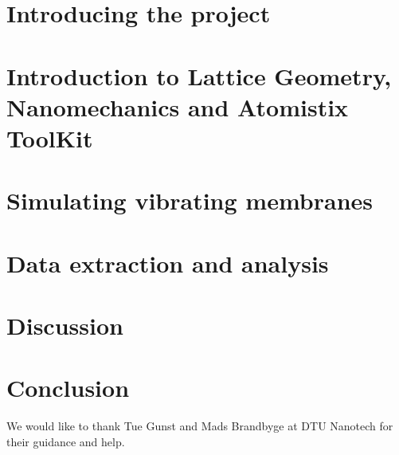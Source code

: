 \documentclass[aps, prb, a4paper, english, 12pt, twocolumn, longbibliography, amsmath, amssymb]{revtex4-1}
\begin{document}
\thispagestyle{empty}
\newpage
\setcounter{page}{1}

\section{Introducing the project}

\section{Introduction to Lattice Geometry, Nanomechanics and Atomistix ToolKit}




\section{Simulating vibrating membranes}



\section{Data extraction and analysis}\label{DEA}

\section{Discussion}

\section{Conclusion}

\begin{acknowledgments}
We would like to thank Tue Gunst and Mads Brandbyge at DTU Nanotech for their guidance and help.
\end{acknowledgments}

\newpage
\onecolumngrid


\newpage
\listoffigures
\listoftables
\listoflistings
\newpage

\end{document}
